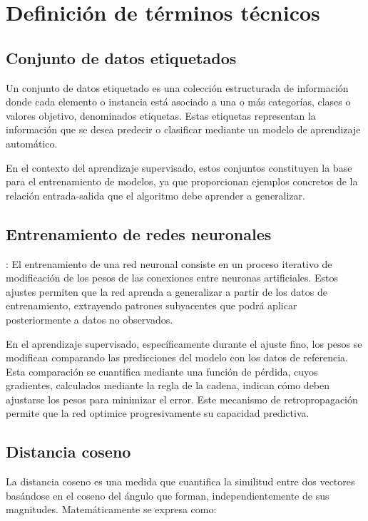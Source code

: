 \appendix

\section{Definición de términos técnicos}

\subsection{Conjunto de datos etiquetados}\label{anexo:datos_et}
Un conjunto de datos etiquetado es una colección estructurada de información donde cada elemento o instancia está asociado a una o más categorías, clases o valores objetivo, denominados etiquetas. Estas etiquetas representan la información que se desea predecir o clasificar mediante un modelo de aprendizaje automático.

En el contexto del aprendizaje supervisado, estos conjuntos constituyen la base para el entrenamiento de modelos, ya que proporcionan ejemplos concretos de la relación entrada-salida que el algoritmo debe aprender a generalizar.



\subsection{Entrenamiento de redes neuronales}
\label{entrenamiento}: El entrenamiento de una red neuronal consiste en un proceso iterativo de modificación de los pesos de las conexiones entre neuronas artificiales. Estos ajustes permiten que la red aprenda a generalizar a partir de los datos de entrenamiento, extrayendo patrones subyacentes que podrá aplicar posteriormente a datos no observados.

En el aprendizaje supervisado, específicamente durante el ajuste fino, los pesos se modifican comparando las predicciones del modelo con los datos de referencia. Esta comparación se cuantifica mediante una función de pérdida, cuyos gradientes, calculados mediante la regla de la cadena, indican cómo deben ajustarse los pesos para minimizar el error. Este mecanismo de retropropagación permite que la red optimice progresivamente su capacidad predictiva.

\subsection{Distancia coseno}\label{anexo:dis_cos}
La distancia coseno es una medida que cuantifica la similitud entre dos vectores basándose en el coseno del ángulo que forman, independientemente de sus magnitudes. Matemáticamente se expresa como: 

